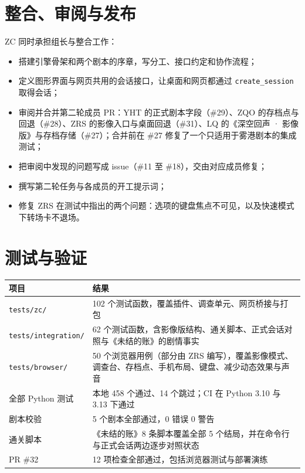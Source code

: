 \documentclass[11pt,a4paper,fontset=mac]{ctexart}
\begin{document}
\section{整合、审阅与发布}

ZC 同时承担组长与整合工作：

\begin{itemize}
  \item 搭建引擎骨架和两个剧本的序章，写分工、接口约定和协作流程；
  \item 定义图形界面与网页共用的会话接口，让桌面和网页都通过 \texttt{create\_session} 取得会话；
  \item 审阅并合并第二轮成员 PR：YHT 的正式剧本字段（\#29）、ZQO 的存档点与回退（\#28）、ZRS 的影像入口与桌面回退（\#31）、LQ 的《深空回声 · 影像版》与存档存储（\#27）；合并前在 \#27 修复了一个只适用于雾港剧本的集成测试；
  \item 把审阅中发现的问题写成 issue（\#11 至 \#18），交由对应成员修复；
  \item 撰写第二轮任务与各成员的开工提示词；
  \item 修复 ZRS 在测试中指出的两个问题：选项的键盘焦点不可见，以及快速模式下转场卡不退场。
\end{itemize}

\section{测试与验证}

\begin{table}[h]
\centering
\begin{tabularx}{\linewidth}{@{}p{4.2cm}L@{}}
\toprule
项目 & 结果 \\
\midrule
\texttt{tests/zc/} & 102 个测试函数，覆盖插件、调查单元、网页桥接与打包 \\
\texttt{tests/integration/} & 62 个测试函数，含影像版结构、通关脚本、正式会话对照与《未结的账》的剧情事实 \\
\texttt{tests/browser/} & 50 个浏览器用例（部分由 ZRS 编写），覆盖影像模式、调查台、存档点、手机布局、键盘、减少动态效果与声音 \\
全部 Python 测试 & 本地 458 个通过、14 个跳过；CI 在 Python 3.10 与 3.13 下通过 \\
剧本校验 & 5 个剧本全部通过，0 错误 0 警告 \\
通关脚本 & 《未结的账》8 条脚本覆盖全部 5 个结局，并在命令行与正式会话两边逐步对照状态 \\
PR \#32 & 12 项检查全部通过，包括浏览器测试与部署演练 \\
\bottomrule
\end{tabularx}
\end{table}
\end{document}
